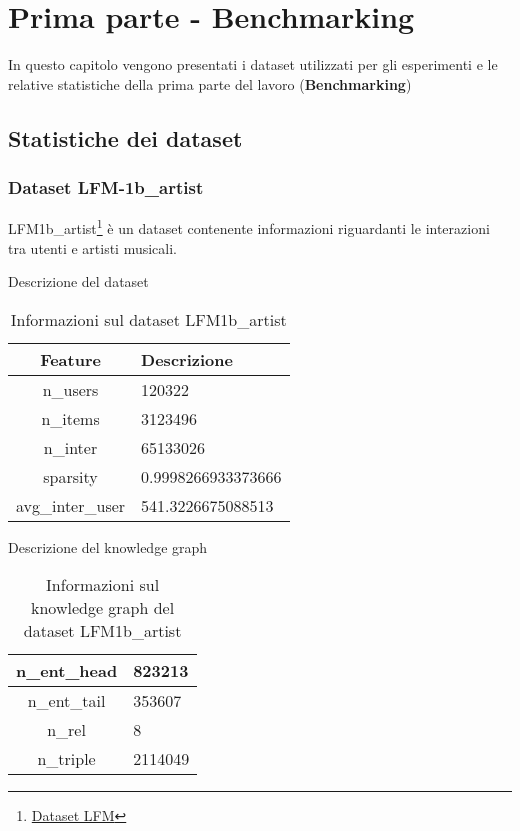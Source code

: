 \section{Prima parte - Benchmarking}

\noindent In questo capitolo vengono presentati i dataset utilizzati per gli esperimenti e le relative statistiche della prima parte del lavoro (\textbf{Benchmarking})


\subsection{Statistiche dei dataset}

\subsubsection{Dataset LFM-1b\_artist}

LFM1b\_artist\footnote{\href{https://github.com/RUCAIBox/RecSysDatasets/blob/master/conversion_tools/usage/LFM-1b.md}{Dataset LFM}}{} è un dataset contenente informazioni riguardanti le interazioni tra utenti e artisti musicali.

\noindent Descrizione del dataset
\begin{table}[H]
    \centering
    \footnotesize
    \begin{tabularx}{\textwidth}{|c|X|}
        \hline
        \textbf{Feature} & \textbf{Descrizione} \\
        \hline
        n\_users & 120322 \\
        \hline
        n\_items & 3123496 \\
        \hline
        n\_inter & 65133026 \\
        \hline
        sparsity & 0.9998266933373666 \\
        \hline
        avg\_inter\_user & 541.3226675088513 \\
        \hline
    \end{tabularx}
    \caption{Informazioni sul dataset LFM1b\_artist}
    \label{tab:dataset_info}
\end{table}


\noindent Descrizione del knowledge graph
\begin{table}[H]
    \centering
    \footnotesize
    \begin{tabularx}{\textwidth}{|c|X|}
        \hline
        n\_ent\_head & 823213 \\
        \hline
        n\_ent\_tail & 353607 \\
        \hline
        n\_rel & 8 \\
        \hline
        n\_triple & 2114049 \\
        \hline
    \end{tabularx}
    \caption{Informazioni sul knowledge graph del dataset LFM1b\_artist}
    \label{tab:dataset_info}
\end{table}




